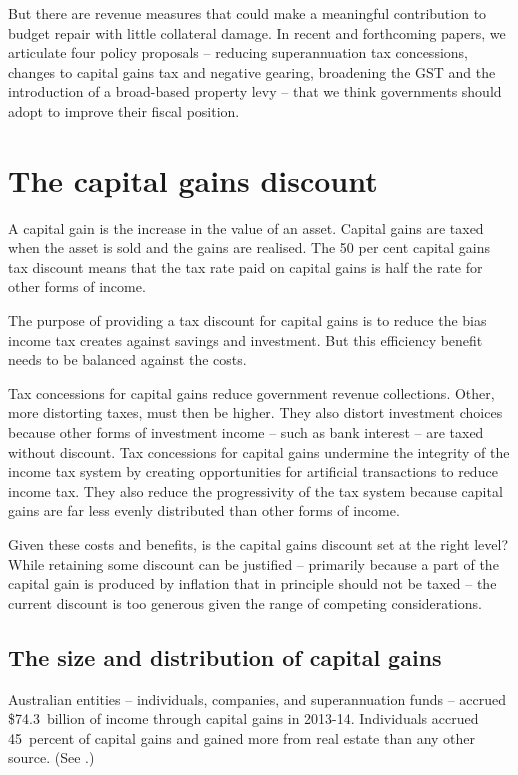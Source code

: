 \documentclass{grattan}\usepackage[]{graphicx}\usepackage[]{color}
\begin{document}
But there are revenue measures that could make a meaningful contribution to budget repair with little collateral damage. In recent and forthcoming papers, we articulate four policy proposals -- reducing superannuation tax concessions, changes to capital gains tax and negative gearing, broadening the GST and the introduction of a broad-based property levy -- that we think governments should adopt to improve their fiscal position.

\chapter{The capital gains discount}
A capital gain is the increase in the value of an asset. Capital gains are taxed when the asset is sold and the gains are realised. The 50 per cent capital gains tax discount means that the tax rate paid on capital gains is half the rate for other forms of income. 

The purpose of providing a tax discount for capital gains is to reduce the bias income tax creates against savings and investment. But this efficiency benefit needs to be balanced against the costs. 

Tax concessions for capital gains reduce government revenue collections. Other, more distorting taxes, must then be higher. They also distort investment choices because other forms of investment income – such as bank interest – are taxed without discount. Tax concessions for capital gains undermine the integrity of the income tax system by creating opportunities for artificial transactions to reduce income tax. They also reduce the progressivity of the tax system because capital gains are far less evenly distributed than other forms of income. 

Given these costs and benefits, is the capital gains discount set at the right level? While retaining some discount can be justified – primarily because a part of the capital gain is produced by inflation that in principle should not be taxed – the current discount is too generous given the range of competing considerations.


\section{The size and distribution of capital gains}




Australian entities -- individuals, companies, and superannuation funds -- accrued \$74.3~billion of income through capital gains in 2013-14. Individuals accrued 45~percent
of capital gains and gained more from real estate than any other source. (See .)
\end{document}
